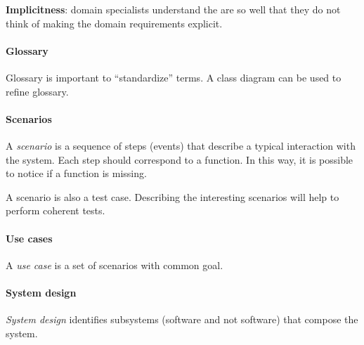 \textbf{Implicitness}: domain specialists understand the are so well that they do not think of making the domain requirements explicit.

\paragraph{Glossary}
Glossary is important to ``standardize'' terms. A class diagram can be used to refine glossary.

\paragraph{Scenarios}
A \emph{scenario} is a sequence of steps (events) that describe a typical interaction with the system. Each step should correspond to a function. In this way, it is possible to notice if a function is missing.

A scenario is also a test case. Describing the interesting scenarios will help to perform 
coherent tests.

\paragraph{Use cases}
A \emph{use case} is a set of scenarios with common goal.

\paragraph{System design}
\emph{System design} identifies subsystems (software and not software) that compose the system.